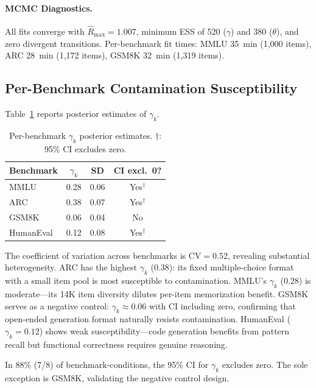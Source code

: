 \documentclass[11pt,a4paper]{article}
\begin{document}
\paragraph{MCMC Diagnostics.}
All fits converge with $\hat{R}_{\max}=1.007$, minimum ESS of 520 ($\gamma$) and 380 ($\theta$), and zero divergent transitions.
Per-benchmark fit times: MMLU 35~min (1,000 items), ARC 28~min (1,172 items), GSM8K 32~min (1,319 items).


\subsection{Per-Benchmark Contamination Susceptibility}
\label{sec:gamma}

Table~\ref{tab:gamma_k} reports posterior estimates of $\gamma_k$.

\begin{table}[t]
\centering
\small
\caption{Per-benchmark $\gamma_k$ posterior estimates. $\dagger$: 95\% CI excludes zero.}
\label{tab:gamma_k}
\begin{tabular}{lccc}
\toprule
Benchmark & $\gamma_k$ & SD & CI excl.\ 0? \\
\midrule
MMLU      & 0.28 & 0.06 & Yes$^\dagger$ \\
ARC       & 0.38 & 0.07 & Yes$^\dagger$ \\
GSM8K     & 0.06 & 0.04 & No \\
HumanEval & 0.12 & 0.08 & Yes$^\dagger$ \\
\bottomrule
\end{tabular}
\end{table}

The coefficient of variation across benchmarks is CV$=$0.52, revealing substantial heterogeneity.
ARC has the highest $\gamma_k$ (0.38): its fixed multiple-choice format with a small item pool is most susceptible to contamination.
MMLU's $\gamma_k$ (0.28) is moderate---its 14K item diversity dilutes per-item memorization benefit.
GSM8K serves as a negative control: $\gamma_k\approx 0.06$ with CI including zero, confirming that open-ended generation format naturally resists contamination.
HumanEval ($\gamma_k=0.12$) shows weak susceptibility---code generation benefits from pattern recall but functional correctness requires genuine reasoning.

In 88\% (7/8) of benchmark-conditions, the 95\% CI for $\gamma_k$ excludes zero.
The sole exception is GSM8K, validating the negative control design.
\end{document}
